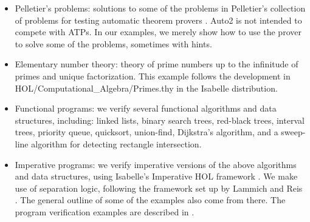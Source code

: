 \documentclass[11pt,a4paper]{article}
\begin{document}
\begin{itemize}
\item Pelletier's problems: solutions to some of the problems in
  Pelletier's collection of problems for testing automatic theorem
  provers \cite{pelletier}. Auto2 is not intended to compete with
  ATPs. In our examples, we merely show how to use the prover to solve
  some of the problems, sometimes with hints.

\item Elementary number theory: theory of prime numbers up to the
  infinitude of primes and unique factorization. This example follows
  the development in HOL/Computational\_Algebra/Primes.thy in the
  Isabelle distribution.

\item Functional programs: we verify several functional algorithms and
  data structures, including: linked lists, binary search trees,
  red-black trees, interval trees, priority queue, quicksort,
  union-find, Dijkstra's algorithm, and a sweep-line algorithm for
  detecting rectangle intersection.

\item Imperative programs: we verify imperative versions of the above
  algorithms and data structures, using Isabelle's Imperative HOL
  framework \cite{imphol}. We make use of separation logic, following
  the framework set up by Lammich and Reis
  \cite{Separation_Logic_Imperative_HOL-AFP}. The general outline of
  some of the examples also come from there. The program verification
  examples are described in \cite{zhan18a}.
\end{itemize}





\end{document}
